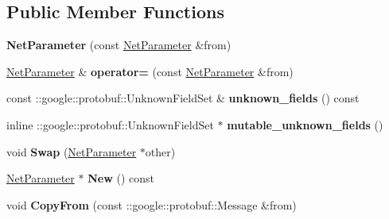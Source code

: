 \subsection*{Public Member Functions}
\begin{DoxyCompactItemize}
\item 
\mbox{\label{classcaffe_1_1_net_parameter_a0d81cc5257aa64aa05868550571624da}} 
{\bfseries Net\+Parameter} (const \mbox{\hyperlink{classcaffe_1_1_net_parameter}{Net\+Parameter}} \&from)
\item 
\mbox{\label{classcaffe_1_1_net_parameter_a2a2737325d6ff315c04d431a873dfb5b}} 
\mbox{\hyperlink{classcaffe_1_1_net_parameter}{Net\+Parameter}} \& {\bfseries operator=} (const \mbox{\hyperlink{classcaffe_1_1_net_parameter}{Net\+Parameter}} \&from)
\item 
\mbox{\label{classcaffe_1_1_net_parameter_a6ed9cbc10b53fbea32d2dfe0bf56fe19}} 
const \+::google\+::protobuf\+::\+Unknown\+Field\+Set \& {\bfseries unknown\+\_\+fields} () const
\item 
\mbox{\label{classcaffe_1_1_net_parameter_aaf4a2a26ac20940adc84b5920a089172}} 
inline \+::google\+::protobuf\+::\+Unknown\+Field\+Set $\ast$ {\bfseries mutable\+\_\+unknown\+\_\+fields} ()
\item 
\mbox{\label{classcaffe_1_1_net_parameter_aaf32716587fbdcfc1fa9c117562c42fd}} 
void {\bfseries Swap} (\mbox{\hyperlink{classcaffe_1_1_net_parameter}{Net\+Parameter}} $\ast$other)
\item 
\mbox{\label{classcaffe_1_1_net_parameter_a56fbef3fcd699bb90b09c45b20fd4a66}} 
\mbox{\hyperlink{classcaffe_1_1_net_parameter}{Net\+Parameter}} $\ast$ {\bfseries New} () const
\item 
\mbox{\label{classcaffe_1_1_net_parameter_aae3cec437cedde7535e5813746696367}} 
void {\bfseries Copy\+From} (const \+::google\+::protobuf\+::\+Message \&from)
\item 
\mbox{\label{classcaffe_1_1_net_parameter_ac193cf00f8a540e2eb250c9d8d303a58}} 

\end{DoxyCompactItemize}
